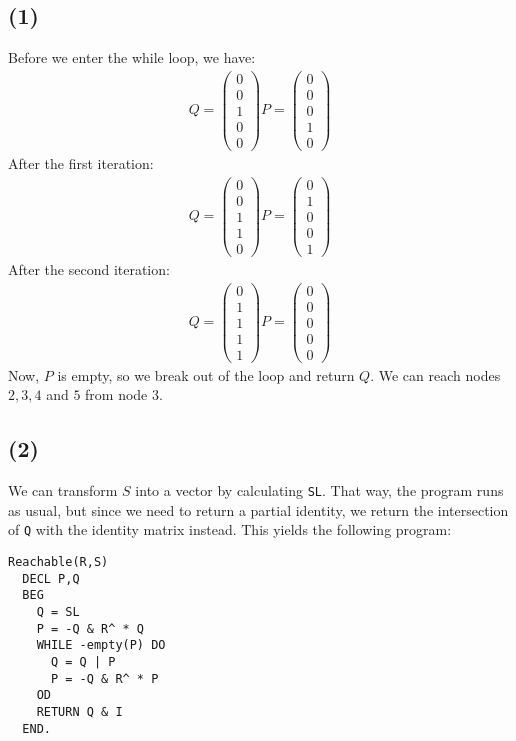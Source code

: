 \documentclass[a4paper, fleqn]{article}
\begin{document}
\subsection*{(1)}
Before we enter the while loop, we have:
\begin{align*}
  Q=\begin{pmatrix}
  0 \\
  0 \\
  1 \\
  0 \\
  0
  \end{pmatrix}
  P =\begin{pmatrix}
  0 \\
  0 \\
  0 \\
  1 \\
  0
  \end{pmatrix}
\end{align*}
After the first iteration:
\begin{align*}
  Q=\begin{pmatrix}
  0 \\
  0 \\
  1 \\
  1 \\
  0
  \end{pmatrix}
  P =\begin{pmatrix}
  0 \\
  1 \\
  0 \\
  0 \\
  1
  \end{pmatrix}
\end{align*}
After the second iteration:
\begin{align*}
  Q=\begin{pmatrix}
  0 \\
  1 \\
  1 \\
  1 \\
  1
  \end{pmatrix}
  P =\begin{pmatrix}
  0 \\
  0 \\
  0 \\
  0 \\
  0
  \end{pmatrix}
\end{align*}
Now, $P$ is empty, so we break out of the loop and return $Q$. We can reach nodes
$2,3,4$ and $5$ from node $3$.

\subsection*{(2)}
We can transform $S$ into a vector by calculating \texttt{SL}. That way, the program runs
as usual, but since we need to return a partial identity, we return the intersection of
\texttt{Q} with the identity matrix instead. This yields the following program:
\begin{verbatim}
Reachable(R,S)
  DECL P,Q
  BEG
    Q = SL
    P = -Q & R^ * Q
    WHILE -empty(P) DO
      Q = Q | P
      P = -Q & R^ * P
    OD
    RETURN Q & I
  END.
\end{verbatim}
\end{document}
